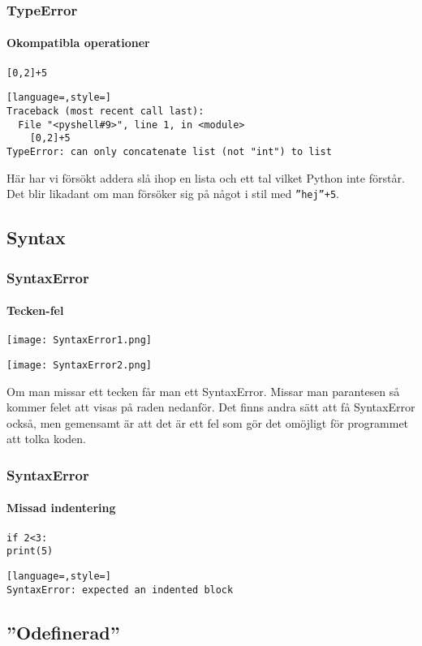 \documentclass[aspectratio=169]{beamer}
\begin{document}
\begin{frame}[fragile]
\frametitle{TypeError}
\framesubtitle{Okompatibla operationer}

\begin{lstlisting}
[0,2]+5
\end{lstlisting}

\begin{lstlisting}[language=,style=]
Traceback (most recent call last):
  File "<pyshell#9>", line 1, in <module>
    [0,2]+5
TypeError: can only concatenate list (not "int") to list
\end{lstlisting}

Här har vi försökt addera slå ihop en lista och ett tal vilket Python inte förstår. Det blir likadant om man försöker sig på något i stil med \texttt{''hej''+5}.

\end{frame}

\subsection{Syntax}

\begin{frame}[fragile]
\frametitle{SyntaxError}
\framesubtitle{Tecken-fel}

\texttt{[image: SyntaxError1.png]}

\texttt{[image: SyntaxError2.png]}

Om man missar ett tecken får man ett SyntaxError. Missar man parantesen så kommer felet att visas på raden nedanför. Det finns andra sätt att få SyntaxError också, men gemensamt är att det är ett fel som gör det omöjligt för programmet att tolka koden.

\end{frame}

\begin{frame}[fragile]
\frametitle{SyntaxError}
\framesubtitle{Missad indentering}

\begin{lstlisting}
if 2<3:
print(5)
\end{lstlisting}

\begin{lstlisting}[language=,style=]
SyntaxError: expected an indented block
\end{lstlisting}

\end{frame}

\subsection{''Odefinerad''}
\end{document}

